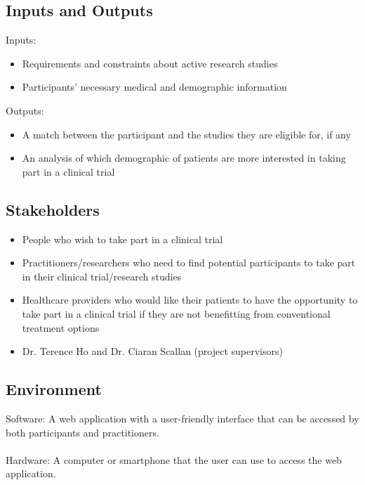 \documentclass{article}
\begin{document}
\subsection{Inputs and Outputs}

Inputs:
\begin{itemize}
    \item Requirements and constraints about active research studies
    \item Participants' necessary medical and demographic information
\end{itemize}

\noindent Outputs:
\begin{itemize}
    \item A match between the participant and the studies they are eligible for, if any
    \item An analysis of which demographic of patients are more interested in taking part in a clinical trial
\end{itemize}

\subsection{Stakeholders}
\begin{itemize}
    \item People who wish to take part in a clinical trial
	\item Practitioners/researchers who need to find potential participants to take part in their clinical trial/research studies
	\item Healthcare providers who would like their patients to have the opportunity to take part in a clinical trial if they are not benefitting from conventional treatment options
    \item Dr. Terence Ho and Dr. Ciaran Scallan (project supervisors)
\end{itemize}

\subsection{Environment}
Software: A web application with a user-friendly interface that can be accessed by both participants and practitioners.\\
\\
Hardware: A computer or smartphone that the user can use to access the web application.
\end{document}
